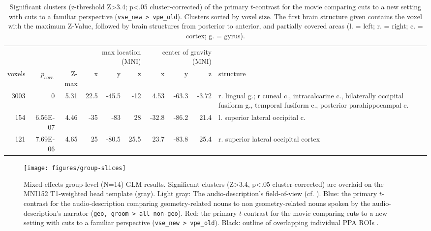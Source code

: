 \documentclass[english]{article}
\begin{document}
\begin{table}[t]
    \caption{Significant clusters (z-threshold Z>3.4; p<.05 cluster-corrected)
        of the primary $t$-contrast for the movie comparing cuts to a new
        setting with cuts to a familiar perspective (\texttt{vse\_new >
        vpe\_old}).
Clusters sorted by voxel size.
The first brain structure given contains the voxel with the maximum Z-Value,
followed by brain structures from posterior to anterior, and partially covered
areas (l. = left; r. = right; c. = cortex; g. = gyrus).}
\label{tab:res-av-group1}
\begin{tabular}{rrrrrrrrrp{3cm}}
\toprule
& & & \multicolumn{3}{r}{max location (MNI)} & \multicolumn{3}{r}{center of gravity (MNI)} &
\\ \cmidrule{4-6} \cmidrule{7-9}
voxels & $p_{corr.}$ & Z-max & x & y & z  & x & y & z & structure \\
\midrule
3003 & 0 & 5.31 & 22.5 & -45.5 & -12 & 4.53 & -63.3 & -3.72 & r. lingual g.; r
cuneal c., intracalcarine c., bilaterally occipital fusiform g., temporal fusiform c., posterior parahippocampal c.  \\
154 & 6.56E-07 & 4.46 & -35 & -83 & 28 & -32.8 & -86.2 & 21.4 & l. superior lateral occipital c. \\
121 & 7.69E-06 & 4.65 & 25 & -80.5 & 25.5 & 23.7 & -83.8 & 25.4 & r. superior lateral occipital cortex \\
\bottomrule
\end{tabular}
\end{table}


\begin{figure} \centering
    \texttt{[image: figures/group-slices]}
    \caption{Mixed-effects group-level (N=14) GLM results. Significant clusters
        (Z>3.4, p<.05 cluster-corrected) are overlaid on the MNI152 T1-weighted
        head template (gray).
        Light gray: The audio-description's field-of-view
        (cf. \citep{hanke2014audiomovie}).
        Blue: the primary $t$-contrast for the audio-description comparing
        geometry-related nouns to non geometry-related nouns spoken by the
        audio-description's narrator (\texttt{geo, groom > all non-geo}).
        Red: the primary $t$-contrast for the movie comparing cuts to a new
        setting with cuts to a familiar perspective (\texttt{vse\_new >
        vpe\_old}).
        Black: outline of overlapping individual PPA ROIs      \citep{sengupta2016extension}.}
    \label{fig:group-slices}
\end{figure}
\end{document}
